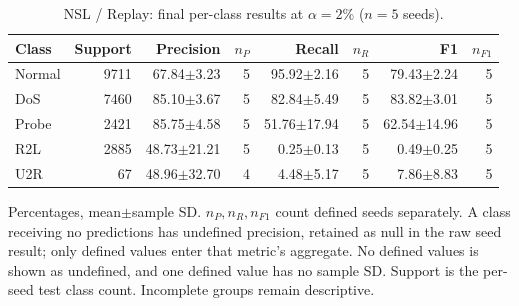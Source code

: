 \begin{table}[t]
\centering\scriptsize
\setlength{\tabcolsep}{3.3pt}
\caption{NSL / Replay: final per-class results at $\alpha=2\%$ ($n=5$ seeds).}\label{tab:forgetting-class-nsl_kdd-replay}
\begin{tabular}{lrrrrrrr}
\toprule
Class & Support & Precision & $n_P$ & Recall & $n_R$ & F1 & $n_{F1}$ \\
\midrule
Normal & 9711 & 67.84$\pm$3.23 & 5 & 95.92$\pm$2.16 & 5 & 79.43$\pm$2.24 & 5 \\
DoS & 7460 & 85.10$\pm$3.67 & 5 & 82.84$\pm$5.49 & 5 & 83.82$\pm$3.01 & 5 \\
Probe & 2421 & 85.75$\pm$4.58 & 5 & 51.76$\pm$17.94 & 5 & 62.54$\pm$14.96 & 5 \\
R2L & 2885 & 48.73$\pm$21.21 & 5 & 0.25$\pm$0.13 & 5 & 0.49$\pm$0.25 & 5 \\
U2R & 67 & 48.96$\pm$32.70 & 4 & 4.48$\pm$5.17 & 5 & 7.86$\pm$8.83 & 5 \\
\bottomrule
\end{tabular}
\par\smallskip\begin{minipage}{0.98\textwidth}\scriptsize Percentages, mean$\pm$sample SD. $n_P,n_R,n_{F1}$ count defined seeds separately. A class receiving no predictions has undefined precision, retained as null in the raw seed result; only defined values enter that metric's aggregate. No defined values is shown as undefined, and one defined value has no sample SD. Support is the per-seed test class count. Incomplete groups remain descriptive.\end{minipage}
\end{table}

